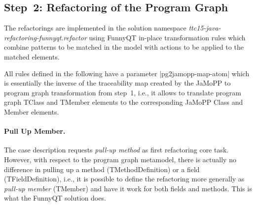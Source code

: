 \documentclass[submission]{eptcs}
\newcommand{\code}{\clojureinline}
\begin{document}
\subsection{Step~2: Refactoring of the Program Graph}
\label{sec:step-2:refactoring-pg}

The refactorings are implemented in the solution namespace
\emph{ttc15-java-refactoring-funnyqt.refactor} using FunnyQT in-place
transformation rules which combine patterns to be matched in the model with
actions to be applied to the matched elements.

All rules defined in the following have a parameter \code|pg2jamopp-map-atom|
which is essentially the inverse of the traceability map created by the JaMoPP
to program graph transformation from step~1, i.e., it allows to translate
program graph \textsf{TClass} and \textsf{TMember} elements to the
corresponding JaMoPP \textsf{Class} and \textsf{Member} elements.

\paragraph{Pull Up Member.}

The case description requests \emph{pull-up method} as first refactoring core
task.  However, with respect to the program graph metamodel, there is actually
no difference in pulling up a method (\textsf{TMethodDefinition}) or a field
(\textsf{TFieldDefinition}), i.e., it is possible to define the refactoring
more generally as \emph{pull-up member} (\textsf{TMember}) and have it work for
both fields and methods.  This is what the FunnyQT solution does.
\end{document}
